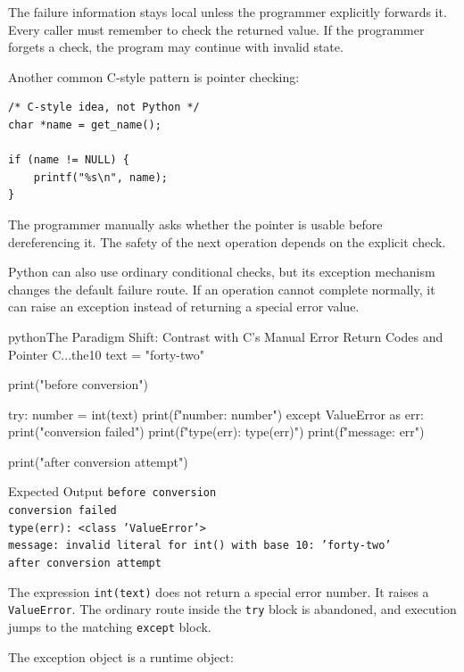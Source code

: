 The failure information stays local unless the programmer explicitly forwards it. Every caller must remember to check the returned value. If the programmer forgets a check, the program may continue with invalid state.

Another common C-style pattern is pointer checking:

\begin{verbatim}
/* C-style idea, not Python */
char *name = get_name();

if (name != NULL) {
    printf("%s\n", name);
}
\end{verbatim}

The programmer manually asks whether the pointer is usable before dereferencing it. The safety of the next operation depends on the explicit check.

Python can also use ordinary conditional checks, but its exception mechanism changes the default failure route. If an operation cannot complete normally, it can raise an exception instead of returning a special error value.

\begin{codebox}[]{python}{The Paradigm Shift: Contrast with C's Manual Error Return Codes and Pointer C...}{the10}
text = "forty-two"

print("before conversion")

try:
    number = int(text)
    print(f"number: {number}")
except ValueError as err:
    print("conversion failed")
    print(f"type(err): {type(err)}")
    print(f"message: {err}")

print("after conversion attempt")
\end{codebox}


\begin{iobox}{Expected Output}
\texttt{before conversion} \\
\texttt{conversion failed} \\
\texttt{type(err): <class 'ValueError'>} \\
\texttt{message: invalid literal for int() with base 10: 'forty-two'} \\
\texttt{after conversion attempt} \\
\end{iobox}


The expression \texttt{int(text)} does not return a special error number. It raises a \texttt{ValueError}. The ordinary route inside the \texttt{try} block is abandoned, and execution jumps to the matching \texttt{except} block.

The exception object is a runtime object:

